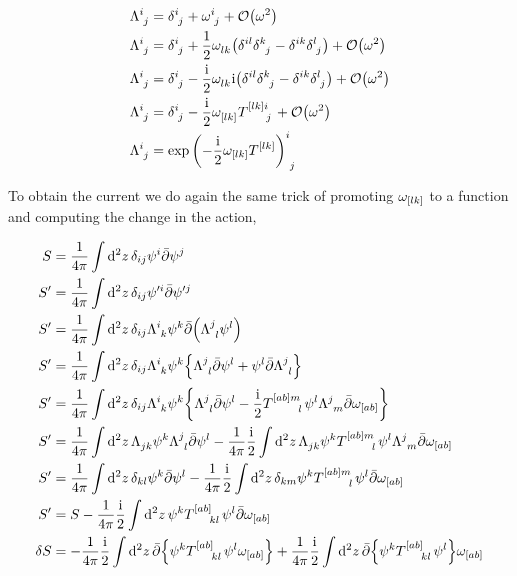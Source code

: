 \begin{align*}
    \tensor{\Lambda}{^i_j}&=\tensor{\delta}{^i_j}+\tensor{\omega}{^i_j}+\mathcal O\qty(\omega^2)\\
    \tensor{\Lambda}{^i_j}&=\tensor{\delta}{^i_j}+\frac12\tensor{\omega}{_l_k}\qty(\tensor{\delta}{^i^l}\tensor{\delta}{^k_j}-\tensor{\delta}{^i^k}\tensor{\delta}{^l_j})+\mathcal O\qty(\omega^2)\\
    \tensor{\Lambda}{^i_j}&=\tensor{\delta}{^i_j}-\frac\im2\tensor{\omega}{_l_k}\im\qty(\tensor{\delta}{^i^l}\tensor{\delta}{^k_j}-\tensor{\delta}{^i^k}\tensor{\delta}{^l_j})+\mathcal O\qty(\omega^2)\\
    \tensor{\Lambda}{^i_j}&=\tensor{\delta}{^i_j}-\frac\im2\tensor{\omega}{_{\qty[lk]}}\tensor{T}{^{\qty[lk]}^i_j}+\mathcal O\qty(\omega^2)\\
    \tensor{\Lambda}{^i_j}&=\tensor{\exp\qty(-\frac\im 2\omega_{\qty[lk]}\tensor{T}{^{\qty[lk]}})}{^i_j}
\end{align*}

To obtain the current we do again the same trick of promoting $\omega_{\qty[lk]}$ to a function and computing the change in the action,

\begin{align*}
    S&=\frac{1}{4\pi}\int\dd[2]{z}\delta_{ij}\psi^i\bar\partial\psi^j\\
    S'&=\frac{1}{4\pi}\int\dd[2]{z}\delta_{ij}\psi'^i\bar\partial\psi'^j\\
    S'&=\frac{1}{4\pi}\int\dd[2]{z}\delta_{ij}\tensor{\Lambda}{^i_k}\psi^k\bar\partial\qty(\tensor{\Lambda}{^j_l}\psi^l)\\
    S'&=\frac{1}{4\pi}\int\dd[2]{z}\delta_{ij}\tensor{\Lambda}{^i_k}\psi^k\qty{\tensor{\Lambda}{^j_l}\bar\partial\psi^l+\psi^l\bar\partial\tensor{\Lambda}{^j_l}}\\
    S'&=\frac{1}{4\pi}\int\dd[2]{z}\delta_{ij}\tensor{\Lambda}{^i_k}\psi^k\qty{\tensor{\Lambda}{^j_l}\bar\partial\psi^l-\frac\im 2\tensor{T}{^{\qty[ab]}^m_l}\psi^l\tensor{\Lambda}{^j_m}\bar\partial\omega_{\qty[ab]}}\\
    S'&=\frac{1}{4\pi}\int\dd[2]{z}\tensor{\Lambda}{_j_k}\psi^k\tensor{\Lambda}{^j_l}\bar\partial\psi^l-\frac{1}{4\pi}\frac\im 2\int\dd[2]{z}\tensor{\Lambda}{_j_k}\psi^k\tensor{T}{^{\qty[ab]}^m_l}\psi^l\tensor{\Lambda}{^j_m}\bar\partial\omega_{\qty[ab]}\\
    S'&=\frac{1}{4\pi}\int\dd[2]{z}\delta_{kl}\psi^k\bar\partial\psi^l-\frac{1}{4\pi}\frac\im 2\int\dd[2]{z}\delta_{km}\psi^k\tensor{T}{^{\qty[ab]}^m_l}\psi^l\bar\partial\omega_{\qty[ab]}\\
    S'&=S-\frac{1}{4\pi}\frac\im 2\int\dd[2]{z}\psi^k\tensor{T}{^{\qty[ab]}_k_l}\psi^l\bar\partial\omega_{\qty[ab]}\\
    \delta S&=-\frac{1}{4\pi}\frac\im 2\int\dd[2]{z}\bar\partial\qty{\psi^k\tensor{T}{^{\qty[ab]}_k_l}\psi^l\omega_{\qty[ab]}}+\frac{1}{4\pi}\frac\im 2\int\dd[2]{z}\bar\partial\qty{\psi^k\tensor{T}{^{\qty[ab]}_k_l}\psi^l}\omega_{\qty[ab]}
\end{align*}

